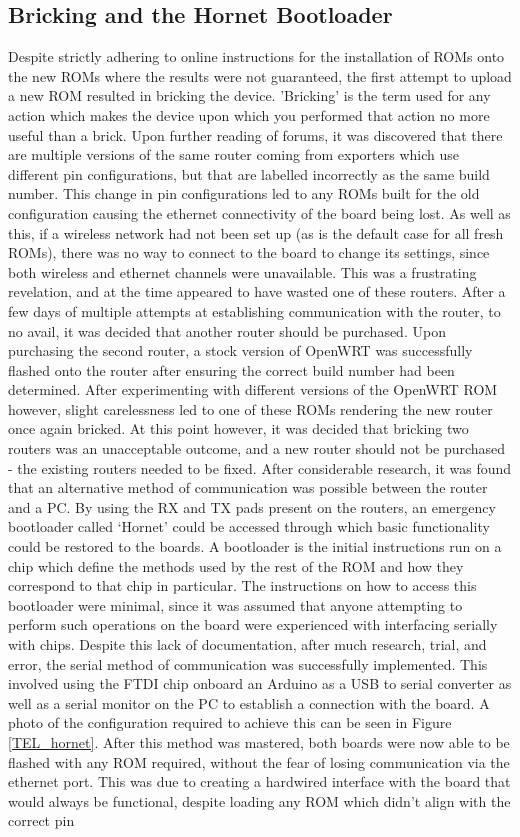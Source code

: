 \subsection{Bricking and the Hornet Bootloader}
Despite strictly adhering to online instructions for the installation of ROMs onto the new ROMs where the results were not guaranteed, the first attempt to upload a new ROM resulted in bricking the device. 'Bricking' is the term used for any action which makes the device upon which you performed that action no more useful than a brick. Upon further reading of forums, it was discovered that there are multiple versions of the same router coming from exporters which use different pin configurations, but that are labelled incorrectly as the same build number. This change in pin configurations led to any ROMs built for the old configuration causing the ethernet connectivity of the board being lost. As well as this, if a wireless network had not been set up (as is the default case for all fresh ROMs), there was no way to connect to the board to change its settings, since both wireless and ethernet channels were unavailable. This was a frustrating revelation, and at the time appeared to have wasted one of these routers. After a few days of multiple attempts at establishing communication with the router, to no avail, it was decided that another router should be purchased. Upon purchasing the second router, a stock version of OpenWRT was successfully flashed onto the router after ensuring the correct build number had been determined. After experimenting with different versions of the OpenWRT ROM however, slight carelessness led to one of these ROMs rendering the new router once again bricked. At this point however, it was decided that bricking two routers was an unacceptable outcome, and a new router should not be purchased - the existing routers needed to be fixed. After considerable research, it was found that an alternative method of communication was possible between the router and a PC. By using the RX and TX pads present on the routers, an emergency bootloader called `Hornet' could be accessed through which basic functionality could be restored to the boards. A bootloader is the initial instructions run on a chip which define the methods used by the rest of the ROM and how they correspond to that chip in particular. The instructions on how to access this bootloader were minimal, since it was assumed that anyone attempting to perform such operations on the board were experienced with interfacing serially with chips. Despite this lack of documentation, after much research, trial, and error, the serial method of communication was successfully implemented. This involved using the FTDI chip onboard an Arduino as a USB to serial converter as well as a serial monitor on the PC to establish a connection with the board. A photo of the configuration required to achieve this can be seen in Figure \ref{TEL_hornet}. After this method was mastered, both boards were now able to be flashed with any ROM required, without the fear of losing communication via the ethernet port. This was due to creating a hardwired interface with the board that would always be functional, despite loading any ROM which didn't align with the correct pin 